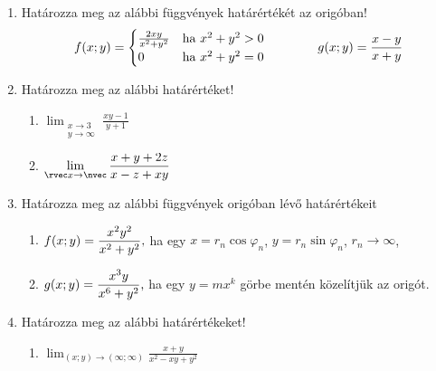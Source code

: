 \documentclass[a4paper, 12pt, fleqn]{scrartcl}
\begin{document}
\begin{enumerate}
  \item Határozza meg az alábbi függvények határértékét az origóban!
        \begin{equation*}
          f(x; y) = \begin{cases}
            \frac{2xy}{x^2 + y^2} & \text{ha } x^2 + y^2 > 0 \\
            0                     & \text{ha } x^2 + y^2 = 0
          \end{cases}
          \hspace{14mm}
          g(x; y) = \frac{x - y}{x + y}
        \end{equation*}

  \item Határozza meg az alábbi határértéket!
        \begin{multicols}{2}
          \begin{enumerate}
            \item $\displaystyle
                    \lim_{\substack{x\to 3\\y\to \infty}} \frac{xy - 1}{y + 1}
                  $

            \item $\displaystyle
                    \lim_{\rvec x \to \nvec} \frac{x + y + 2z}{x - z + xy}
                  $
          \end{enumerate}
        \end{multicols}

  \item Határozza meg az alábbi függvények origóban lévő határértékeit
        \begin{enumerate}
          \item $\displaystyle
                  f(x; y) = \frac{x^2 y^2}{x^2 + y^2}
                  \text,
                $
                \tabto{4cm}
                ha egy $x = r_n \cos \varphi_n$, $y = r_n \sin \varphi_n$,
                $r_n \to \infty$,

          \item $\displaystyle
                  g(x; y) = \frac{x^3 y}{x^6 + y^2}
                  \text,
                $
                \tabto{4cm}
                ha egy $y = mx^k$ görbe mentén közelítjük az origót.
        \end{enumerate}

  \item Határozza meg az alábbi határértékeket!
        \begin{multicols}{2}
          \begin{enumerate}
            \item $\displaystyle
                    \lim_{(x; y) \to (\infty; \infty)}
                    \frac{x+y}{x^2-xy+y^2}
                  $


\end{enumerate}
\end{multicols}
\end{enumerate}
\end{document}
